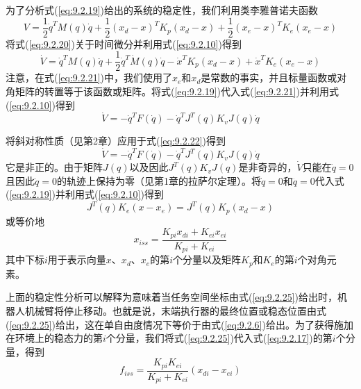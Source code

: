 \documentclass[12pt,a4paper]{ctexart}
\begin{document}
为了分析式(\ref{eq:9.2.19})给出的系统的稳定性，我们利用类李雅普诺夫函数
\begin{equation}\label{eq:9.2.20}
V = \frac{1}{2}\dot{q}^T M(q)\dot{q} + \frac{1}{2}(x_d - x)^T K_p(x_d - x) + \frac{1}{2}(x_e - x)^T K_e(x_e - x)
\end{equation}
将式(\ref{eq:9.2.20})关于时间微分并利用式(\ref{eq:9.2.10})得到
\begin{equation}\label{eq:9.2.21}
\dot{V} = \dot{q}^T M(q)\ddot{q} + \frac{1}{2}\dot{q}^T \dot{M}(q)\dot{q} - \dot{x}^T K_p(x_d - x) + \dot{x}^T K_e(x_e - x)
\end{equation}
注意，在式(\ref{eq:9.2.21})中，我们使用了$x_e$和$x_d$是常数的事实，并且标量函数或对角矩阵的转置等于该函数或矩阵。将式(\ref{eq:9.2.19})代入式(\ref{eq:9.2.21})并利用式(\ref{eq:9.2.10})得到
\begin{equation}\label{eq:9.2.22}
\dot{V} = -\dot{q}^T F(\dot{q}) - \dot{q}^T J^T(q)K_v J(q)\dot{q}
\end{equation}

将斜对称性质（见第2章）应用于式(\ref{eq:9.2.22})得到
\begin{equation}\label{eq:9.2.23}
\dot{V} = -\dot{q}^T F(\dot{q}) - \dot{q}^T J^T(q)K_v J(q)\dot{q}
\end{equation}
它是非正的。由于矩阵$J(q)$以及因此$J^T(q)K_v J(q)$是非奇异的，$\dot{V}$只能在$\dot{q} = 0$且因此$\ddot{q} = 0$的轨迹上保持为零（见第1章的拉萨尔定理）。将$\dot{q} = 0$和$\ddot{q} = 0$代入式(\ref{eq:9.2.19})并利用式(\ref{eq:9.2.10})得到
\begin{equation}\label{eq:9.2.24}
J^T(q)K_e(x - x_e) = J^T(q)K_p(x_d - x)
\end{equation}
或等价地
\begin{equation}\label{eq:9.2.25}
x_{iss} = \frac{K_{pi}x_{di} + K_{ei}x_{ei}}{K_{pi} + K_{ei}}
\end{equation}
其中下标$i$用于表示向量$x$、$x_d$、$x_e$的第$i$个分量以及矩阵$K_p$和$K_e$的第$i$个对角元素。

上面的稳定性分析可以解释为意味着当任务空间坐标由式(\ref{eq:9.2.25})给出时，机器人机械臂将停止移动。也就是说，末端执行器的最终位置或稳态位置由式(\ref{eq:9.2.25})给出，这在单自由度情况下等价于由式(\ref{eq:9.2.6})给出。为了获得施加在环境上的稳态力的第$i$个分量，我们将式(\ref{eq:9.2.25})代入式(\ref{eq:9.2.17})的第$i$个分量，得到
\begin{equation}\label{eq:9.2.26}
f_{iss} = \frac{K_{pi}K_{ei}}{K_{pi} + K_{ei}}(x_{di} - x_{ei})
\end{equation}
\end{document}
